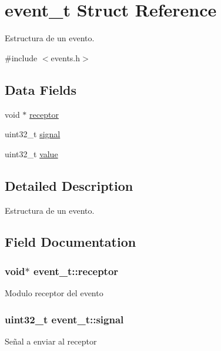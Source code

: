 \hypertarget{structevent__t}{}\section{event\+\_\+t Struct Reference}
\label{structevent__t}


Estructura de un evento.  




{\ttfamily \#include $<$events.\+h$>$}

\subsection*{Data Fields}
\begin{DoxyCompactItemize}
\item 
void $\ast$ \hyperlink{structevent__t_ad214f71181fedae8a3167f5380d7bebc}{receptor}
\item 
uint32\+\_\+t \hyperlink{structevent__t_a4e9ee60cf417f2b1d56babe0ade4da47}{signal}
\item 
uint32\+\_\+t \hyperlink{structevent__t_a707f7b4d3943795acae6a231ff3192bd}{value}
\end{DoxyCompactItemize}


\subsection{Detailed Description}
Estructura de un evento. 

\subsection{Field Documentation}
\subsubsection[{\texorpdfstring{receptor}{receptor}}]{\setlength{\rightskip}{0pt plus 5cm}void$\ast$ event\+\_\+t\+::receptor}\hypertarget{structevent__t_ad214f71181fedae8a3167f5380d7bebc}{}\label{structevent__t_ad214f71181fedae8a3167f5380d7bebc}
Modulo receptor del evento 
\subsubsection[{\texorpdfstring{signal}{signal}}]{\setlength{\rightskip}{0pt plus 5cm}uint32\+\_\+t event\+\_\+t\+::signal}\hypertarget{structevent__t_a4e9ee60cf417f2b1d56babe0ade4da47}{}\label{structevent__t_a4e9ee60cf417f2b1d56babe0ade4da47}
Señal a enviar al receptor 
